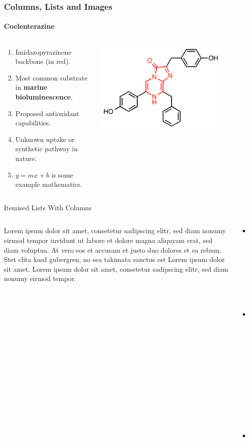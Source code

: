 \documentclass[aspectratio=169]{beamer}
\begin{document}
\begin{frame}
   \frametitle{Columns, Lists and Images}
   \framesubtitle{Coelenterazine}
   \begin{columns}[T]
      \begin{column}{0.5\textwidth}
         \begin{enumerate}
            \item Imidazopyrazinone backbone (in red).
            \item Most common substrate in \textbf{marine bioluminescence}.
            \item Proposed antioxidant capabilities.
            \item Unknown uptake or synthetic pathway in nature.
            \item $y=mx+b$ is some example mathematics.
         \end{enumerate}
      \end{column}
      \begin{column}{0.5\textwidth}
         \centering
         \includegraphics[width=0.8\textwidth]{coelenterazine.png}
      \end{column}
   \end{columns}
\end{frame}


\begin{frame}{Itemised Lists With Columns}
   \begin{columns}[T]
      \begin{column}{0.48\textwidth}
      Lorem ipsum dolor sit amet, consetetur sadipscing elitr, sed diam nonumy eirmod tempor invidunt ut labore et dolore magna aliquyam erat, sed diam voluptua. At vero eos et accusam et justo duo dolores et ea rebum. Stet clita kasd gubergren, no sea takimata sanctus est Lorem ipsum dolor sit amet. Lorem ipsum dolor sit amet, consetetur sadipscing elitr, sed diam nonumy eirmod tempor.
      \end{column}
      \begin{column}{0.48\textwidth}
      \begin{itemize}
         \item One point
         \item Another point
         \item And a \alert{third}!
      \end{itemize}
      \end{column}
   \end{columns}
\end{frame}
\end{document}
